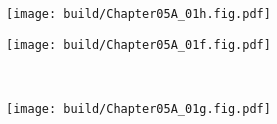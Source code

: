 \begin{Figure}[二阶系统的若干特性]
    \begin{FigureSub}[二阶系统的相位裕度]
        \texttt{[image: build/Chapter05A\_01h.fig.pdf]}
    \end{FigureSub}
    \begin{FigureSub}[二阶系统的过冲]
        \texttt{[image: build/Chapter05A\_01f.fig.pdf]}
    \end{FigureSub}\\ \vspace{0.25cm}
    \begin{FigureSub}[二阶系统的截止频率]
        \texttt{[image: build/Chapter05A\_01g.fig.pdf]}
    \end{FigureSub}
\end{Figure}